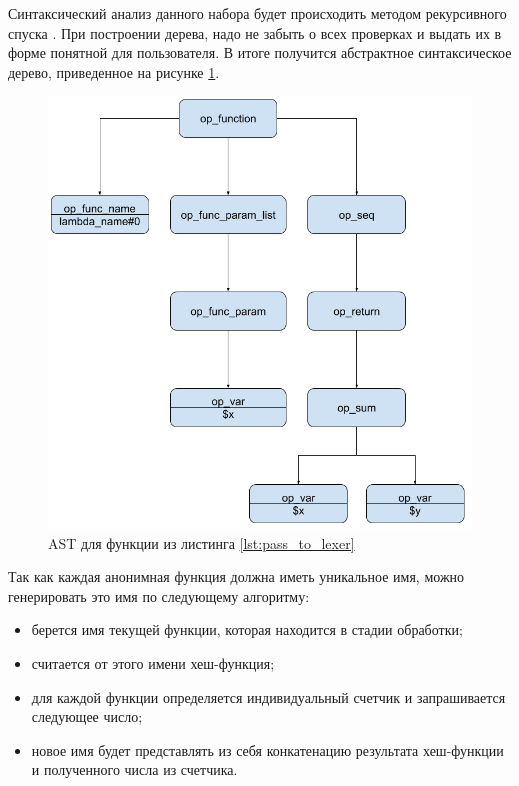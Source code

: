Синтаксический анализ данного набора будет происходить методом рекурсивного спуска \cite{recursive_descent_parser}.
При построении дерева, надо не забыть о всех проверках и выдать их в форме понятной для пользователя.
В итоге получится абстрактное синтаксическое дерево, приведенное на рисунке \ref{fig:AST_for_sum}.
\begin{figure}[H]
    \caption{AST для функции из листинга \ref{lst:pass_to_lexer}}
    \label{fig:AST_for_sum}
    \centering
    \includegraphics[width=\linewidth]{images/ast_for_id}
\end{figure}

Так как каждая анонимная функция должна иметь уникальное имя, можно генерировать это имя по следующему алгоритму:
\begin{itemize}
  \item берется имя текущей функции, которая находится в стадии обработки;
  \item считается от этого имени хеш-функция;
  \item для каждой функции определяется индивидуальный счетчик и запрашивается следующее число;
  \item новое имя будет представлять из себя конкатенацию результата хеш-функции и полученного числа из счетчика.
\end{itemize}

